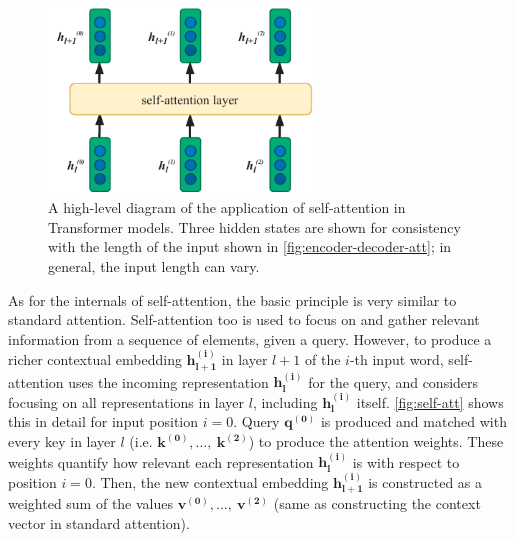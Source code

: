 \documentclass[bsc,frontabs,twoside,singlespacing,parskip,deptreport]{infthesis}
\begin{document}
{{{      \begin{figure}[h!t]
        \centering
        \includegraphics[width=7cm]{graphics/self-att-layer}
        \cprotect\caption{A high-level diagram of the application of self-attention in Transformer models. Three hidden states are shown for consistency with the length of the input shown in \autoref{fig:encoder-decoder-att}; in general, the input length can vary.}
        \label{fig:self-att-layer}
      \end{figure}

      As for the internals of self-attention, the basic principle is very similar to standard attention. Self-attention too is used to focus on and gather relevant information from a sequence of elements, given a query. However, to produce a richer contextual embedding $\bm{h_{l+1}^{(i)}}$ in layer $l+1$ of the $i$-th input word, self-attention uses the incoming representation $\bm{h_l^{(i)}}$ for the query, and considers focusing on all representations in layer $l$, including $\bm{h_l^{(i)}}$ itself. \autoref{fig:self-att} shows this in detail for input position $i=0$. Query $\bm{q^{(0)}}$ is produced and matched with every key in layer $l$ (i.e. $\bm{k^{(0)}},\ldots,\ \bm{k^{(2)}}$) to produce the attention weights. These weights quantify how relevant each representation $\bm{h_l^{(i)}}$ is with respect to position $i=0$. Then, the new contextual embedding $\bm{h_{l+1}^{(i)}}$ is constructed as a weighted sum of the values $\bm{v^{(0)}},\ldots,\ \bm{v^{(2)}}$ (same as constructing the context vector in standard attention).

}}}
\end{document}
